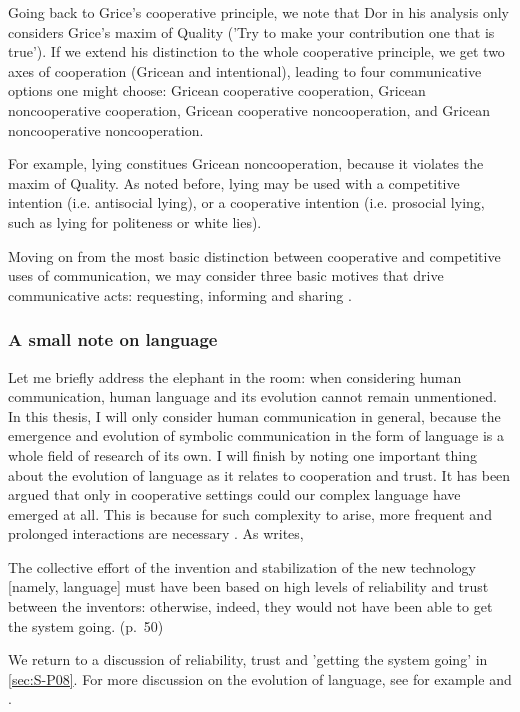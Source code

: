 Going back to Grice's cooperative principle, we note that Dor in his analysis only considers Grice's maxim of Quality ('Try to make your contribution one that is true'). If we extend his distinction to the whole cooperative principle, we get two axes of cooperation (Gricean and intentional), leading to four communicative options one might choose: Gricean cooperative cooperation, Gricean noncooperative cooperation, Gricean cooperative noncooperation, and Gricean noncooperative noncooperation.

For example, lying constitues Gricean noncooperation, because it violates the maxim of Quality. As noted before, lying may be used with a competitive intention (i.e. antisocial lying), or a cooperative intention (i.e. prosocial lying, such as lying for politeness or white lies).

Moving on from the most basic distinction between cooperative and competitive uses of communication, we may consider three basic motives that drive communicative acts:
requesting, informing and sharing \citep{Tomasello08}.

\subsubsection{A small note on language}
\label{sec:comm:language}

Let me briefly address the elephant in the room: when considering human communication, human language and its evolution cannot remain unmentioned. In this thesis, I will only consider human communication in general, because the emergence and evolution of symbolic communication in the form of language is a whole field of research of its own.
I will finish by noting one important thing about the evolution of language as it relates to cooperation and trust. It has been argued that only in cooperative settings could our complex language have emerged at all. This is because for such complexity to arise, more frequent and prolonged interactions are necessary \citep{Benitez21}. As \citet{Dor17} writes,
\begin{quoting}
    The collective effort of the invention and stabilization of the new technology [namely, language] must have been based on high levels of reliability and trust between the inventors: otherwise, indeed, they would not have been able to get the system going.
    \hfill (p.~50)
\end{quoting}
We return to a discussion of reliability, trust and 'getting the system going' in \cref{sec:S-P08}. For more discussion on the evolution of language, see for example \citet{Tomasello08} and \citet{Dor17}.

